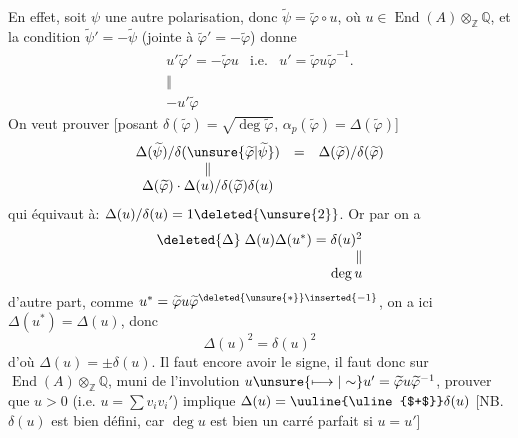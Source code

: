 
En effet, soit $\psi$ une autre polarisation, donc $\widetilde\psi=\widetilde\varphi\circ u$, où $u\in\operatorname{End}(A)\otimes_{\mathbb Z}\mathbb Q$,  et la condition $\widetilde\psi'=-\widetilde\psi$ (jointe à $\widetilde\varphi'=-\widetilde\varphi$) donne
\[
\begin{array}{ccc}
u'\widetilde\varphi'=-\widetilde\varphi u & \text{i.e.} & u'=\widetilde\varphi u\widetilde\varphi^{-1}.\\
\Vert &&\\
-u'\widetilde\varphi &&
\end{array}
\]
On veut prouver [posant $\delta(\widetilde\varphi)=\sqrt{\deg\widetilde\varphi}$, $\alpha_p(\widetilde\varphi)=\Delta(\widetilde\varphi)$]
\[
\begin{array}{ccc}
\Delta(\widetilde\psi)/\delta(\unsure{\widetilde\varphi|\widetilde\psi})&=&\Delta(\widetilde\varphi)/\delta(\widetilde\varphi)\\
\Vert&&\\
\Delta(\widetilde\varphi)\cdot\Delta(u)/\delta(\widetilde\varphi)\delta(u)&&
\end{array}
\]
qui équivaut à: $\Delta(u)/\delta(u)=1\deleted{\unsure{2}}$. Or par  on a
\[
\begin{array}{c}
\deleted{\Delta}\;\Delta(u)\Delta(u^*)=\delta(u)^2\\
\hfill\Vert\\
\hfill\deg u
\end{array}
\]
d'autre part, comme $u^*=\widetilde\varphi u\widetilde\varphi^{\deleted{\unsure{*}}\inserted{-1}}$, on a ici $\Delta(u^*)=\Delta(u)$, donc 
\[
\Delta(u)^2=\delta(u)^2
\]
d'où $\Delta(u)=\pm\delta(u)$. Il faut encore avoir le signe, il faut  donc sur $\operatorname{End}(A)\otimes_{\mathbb Z}\mathbb Q$, muni de l'involution $u\unsure{\longmapsto|\sim}u'=\widetilde\varphi u\widetilde\varphi^{-1}$, prouver que $u>0$ (i.e.  $u=\sum v_iv_i'$)  implique $\Delta(u)={\text{\uuline{\uline{$+$}}}}\delta(u)$ [NB. $\delta(u)$ est bien défini, car $\deg u$ est bien un carré parfait si $u=u'$]

